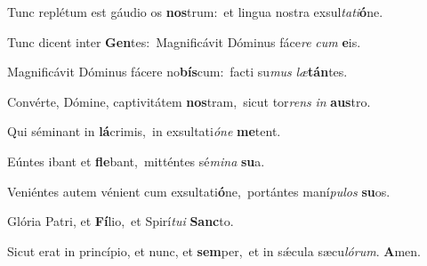 Tunc replétum est gáudio os \textbf{nos}trum:~\redgreheightstar et lingua nostra exsul\textit{ta}\textit{ti}\textbf{ó}ne.

Tunc dicent inter \textbf{Gen}tes:~\redgreheightstar Magnificávit Dóminus fáce\textit{re} \textit{cum} \textbf{e}is.

Magnificávit Dóminus fácere no\textbf{bís}cum:~\redgreheightstar facti su\textit{mus} \textit{læ}\textbf{tán}tes.

Convérte, Dómine, captivitátem \textbf{nos}tram,~\redgreheightstar sicut tor\textit{rens} \textit{in} \textbf{aus}tro.

Qui séminant in \textbf{lá}crimis,~\redgreheightstar in exsultati\textit{ó}\textit{ne} \textbf{me}tent.

Eúntes ibant et \textbf{fle}bant,~\redgreheightstar mitténtes sé\textit{mi}\textit{na} \textbf{su}a.

Veniéntes autem vénient cum exsultati\textbf{ó}ne,~\redgreheightstar portántes maní\textit{pu}\textit{los} \textbf{su}os.

Glória Patri, et \textbf{Fí}lio,~\redgreheightstar et Spirí\textit{tu}\textit{i} \textbf{Sanc}to.

Sicut erat in princípio, et nunc, et \textbf{sem}per,~\redgreheightstar et in sǽcula sæcu\textit{ló}\textit{rum}. \textbf{A}men.

